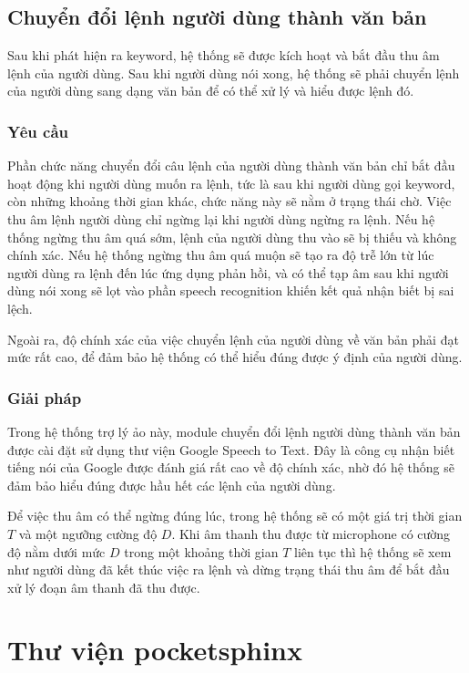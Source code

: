 \subsection{Chuyển đổi lệnh người dùng thành văn bản}

Sau khi phát hiện ra keyword, hệ thống sẽ được kích hoạt và bắt đầu thu âm lệnh của người dùng. Sau khi người dùng nói xong, hệ thống sẽ phải chuyển lệnh của người dùng sang dạng văn bản để có thể xử lý và hiểu được lệnh đó.

\subsubsection{Yêu cầu}

Phần chức năng chuyển đổi câu lệnh của người dùng thành văn bản chỉ bắt đầu hoạt động khi người dùng muốn ra lệnh, tức là sau khi người dùng gọi keyword, còn những khoảng thời gian khác, chức năng này sẽ nằm ở trạng thái chờ. Việc thu âm lệnh người dùng chỉ ngừng lại khi người dùng ngừng ra lệnh. Nếu hệ thống ngừng thu âm quá sớm, lệnh của người dùng thu vào sẽ bị thiếu và không chính xác. Nếu hệ thống ngừng thu âm quá muộn sẽ tạo ra độ trễ lớn từ lúc người dùng ra lệnh đến lúc ứng dụng phản hồi, và có thể tạp âm sau khi người dùng nói xong sẽ lọt vào phần speech recognition khiến kết quả nhận biết bị sai lệch.

Ngoài ra, độ chính xác của việc chuyển lệnh của người dùng về văn bản phải đạt mức rất cao, để đảm bảo hệ thống có thể hiểu đúng được ý định của người dùng.

\subsubsection{Giải pháp}

Trong hệ thống trợ lý ảo này, module chuyển đổi lệnh người dùng thành văn bản được cài đặt sử dụng thư viện Google Speech to Text. Đây là công cụ nhận biết tiếng nói của Google được đánh giá rất cao về độ chính xác, nhờ đó hệ thống sẽ đảm bảo hiểu đúng được hầu hết các lệnh của người dùng.

Để việc thu âm có thể ngừng đúng lúc, trong hệ thống sẽ có một giá trị thời gian $T$ và một ngưỡng cường độ $D$. Khi âm thanh thu được từ microphone có cường độ nằm dưới mức $D$ trong một khoảng thời gian $T$ liên tục thì hệ thống sẽ xem như người dùng đã kết thúc việc ra lệnh và dừng trạng thái thu âm để bắt đầu xử lý đoạn âm thanh đã thu được.

\section{Thư viện pocketsphinx}


